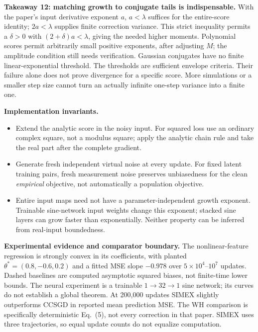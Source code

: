 \documentclass[11pt]{article}
\begin{document}
\textbf{Takeaway 12: matching growth to conjugate tails is indispensable.}
With the paper's input derivative exponent $a$, $a<\lambda$ suffices for the entire-score identity; $2a<\lambda$ supplies finite correction variance. This strict inequality permits a $\delta>0$ with $(2+\delta)a<\lambda$, giving the needed higher moments. Polynomial scores permit arbitrarily small positive exponents, after adjusting $M$; the amplitude condition still needs verification. Gaussian conjugates have no finite linear-exponential threshold.
The thresholds are sufficient envelope criteria. Their failure alone does not prove divergence for a specific score. More simulations or a smaller step size cannot turn an actually infinite one-step variance into a finite one.

\textbf{Implementation invariants.}
\begin{itemize}
\item Extend the analytic score in the noisy input. For squared loss use an ordinary complex square, not a modulus square; apply the analytic chain rule and take the real part after the complete gradient.
\item Generate fresh independent virtual noise at every update. For fixed latent training pairs, fresh measurement noise preserves unbiasedness for the clean \emph{empirical} objective, not automatically a population objective.
\item Entire input maps need not have a parameter-independent growth exponent. Trainable sine-network input weights change this exponent; stacked sine layers can grow faster than exponentially. Neither property can be inferred from real-input boundedness.
\end{itemize}

\textbf{Experimental evidence and comparator boundary.}
The nonlinear-feature regression is strongly convex in its coefficients, with planted $\theta^*=(0.8,-0.6,0.2)$ and a fitted MSE slope $-0.978$ over $5\times10^4$--$10^7$ updates. Dashed baselines are computed asymptotic squared biases, not finite-time lower bounds. The neural experiment is a trainable $1\to32\to1$ sine network; its curves do not establish a global theorem. At 200,000 updates SIMEX slightly outperforms CCSGD in reported mean prediction MSE. The WH comparison is specifically deterministic Eq.\ (5), not every correction in that paper. SIMEX uses three trajectories, so equal update counts do not equalize computation.
\end{document}
